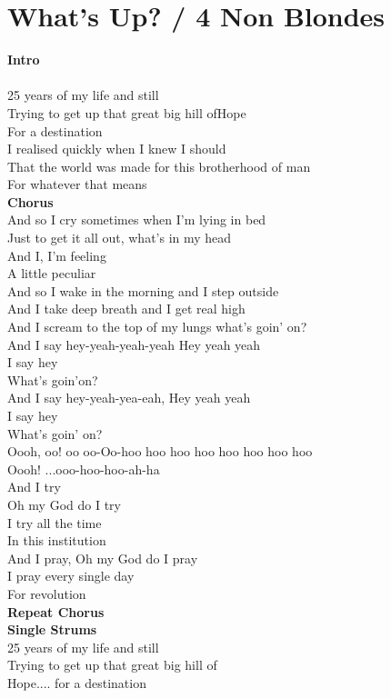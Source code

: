 \section{What's Up? / 4 Non Blondes}\label{sec:whatsup}

  \Gmajor
  \Aminor
  \Cmajor
  
  
\textbf{Intro} \\
 \\
25 years of my life and still\\
Trying to get up that great big hill ofHope\\
For a destination\\
I realised quickly when I knew I should\\
That the world was made for this brotherhood of man\\
For whatever that means\\
\textbf{Chorus}\\
And so I cry sometimes when I'm lying in bed\\
Just to get it all out, what's in my head\\
And I,  I'm feeling\\
A little peculiar\\
And so I wake in the morning and I step outside\\
And I take deep breath and I get real high\\
And I scream to the top of my lungs what's goin' on?\\
And I say hey-yeah-yeah-yeah Hey yeah yeah\\
I say hey\\
What's goin'on?\\
And I say hey-yeah-yea-eah, Hey yeah yeah\\
I say hey\\
What's goin' on?\\
Oooh, oo!  oo oo-Oo-hoo hoo hoo hoo hoo hoo hoo hoo\\
Oooh! ...ooo-hoo-hoo-ah-ha\\
And I try\\
Oh my God do I try\\
I try all the time\\
In this institution\\
And I pray, Oh my God do I pray\\
I pray every single day\\
For revolution\\
\textbf{Repeat Chorus}\\
\textbf{Single Strums}\\
25 years of my life and still\\
Trying to get up that great big hill of\\
Hope.... for a destination\\
